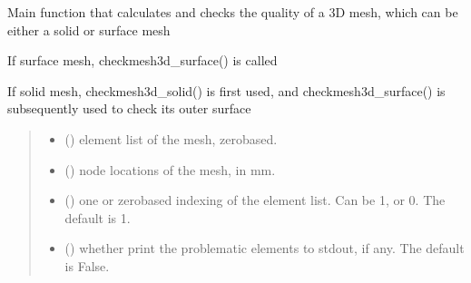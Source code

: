 \documentclass[letterpaper,10pt,english]{sphinxmanual}
\begin{document}
\begin{fulllineitems}
\label{\detokenize{_autosummary/nirfasterff.meshing.meshutils.CheckMesh3D:nirfasterff.meshing.meshutils.CheckMesh3D}}
\pysigstartsignatures
\pysiglinewithargsret
{}
{\sphinxparamcomma {}\sphinxparamcomma {}\sphinxparamcomma {}}
{}
\pysigstopsignatures
\sphinxAtStartPar
Main function that calculates and checks the quality of a 3D mesh, which can be either a solid or surface mesh

\sphinxAtStartPar
If surface mesh, checkmesh3d\_surface() is called

\sphinxAtStartPar
If solid mesh, checkmesh3d\_solid() is first used, and checkmesh3d\_surface() is subsequently used to check its outer surface
\begin{quote}\begin{description}
\begin{itemize}
\item {} 
\sphinxAtStartPar
{} () \textendash{} element list of the mesh, zero\sphinxhyphen{}based.

\item {} 
\sphinxAtStartPar
{} () \textendash{} node locations of the mesh, in mm.

\item {} 
\sphinxAtStartPar
{} (\sphinxstyleliteralemphasis{\sphinxupquote{, }}) \textendash{} one\sphinxhyphen{} or zero\sphinxhyphen{}based indexing of the element list. Can be 1, or 0. The default is 1.

\item {} 
\sphinxAtStartPar
{} (\sphinxstyleliteralemphasis{\sphinxupquote{, }}) \textendash{} whether print the problematic elements to stdout, if any. The default is False.


\end{itemize}
\end{description}
\end{quote}
\end{fulllineitems}
\end{document}
